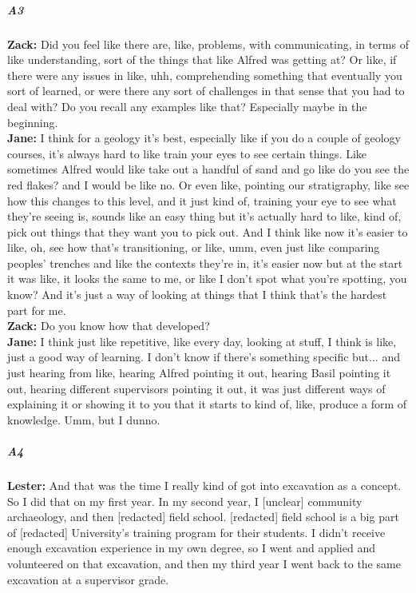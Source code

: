 \documentclass[
]{article}
\begin{document}
\subparagraph{A3}\label{sec-A3}

\textbf{Zack:} Did you feel like there are, like, problems, with
communicating, in terms of like understanding, sort of the things that
like Alfred was getting at? Or like, if there were any issues in like,
uhh, comprehending something that eventually you sort of learned, or
were there any sort of challenges in that sense that you had to deal
with? Do you recall any examples like that? Especially maybe in the
beginning.\\
\textbf{Jane:} I think for a geology it's best, especially like if you
do a couple of geology courses, it's always hard to like train your eyes
to see certain things. Like sometimes Alfred would like take out a
handful of sand and go like do you see the red flakes? and I would be
like no. Or even like, pointing our stratigraphy, like see how this
changes to this level, and it just kind of, training your eye to see
what they're seeing is, sounds like an easy thing but it's actually hard
to like, kind of, pick out things that they want you to pick out. And I
think like now it's easier to like, oh, see how that's transitioning, or
like, umm, even just like comparing peoples' trenches and like the
contexts they're in, it's easier now but at the start it was like, it
looks the same to me, or like I don't spot what you're spotting, you
know? And it's just a way of looking at things that I think that's the
hardest part for me.\\
\textbf{Zack:} Do you know how that developed?\\
\textbf{Jane:} I think just like repetitive, like every day, looking at
stuff, I think is like, just a good way of learning. I don't know if
there's something specific but... and just hearing from like, hearing
Alfred pointing it out, hearing Basil pointing it out, hearing different
supervisors pointing it out, it was just different ways of explaining it
or showing it to you that it starts to kind of, like, produce a form of
knowledge. Umm, but I dunno.

\subparagraph{A4}\label{sec-A4}

\textbf{Lester:} And that was the time I really kind of got into
excavation as a concept. So I did that on my first year. In my second
year, I {[}unclear{]} community archaeology, and then {[}redacted{]}
field school. {[}redacted{]} field school is a big part of
{[}redacted{]} University's training program for their students. I
didn't receive enough excavation experience in my own degree, so I went
and applied and volunteered on that excavation, and then my third year I
went back to the same excavation at a supervisor grade.
\end{document}
